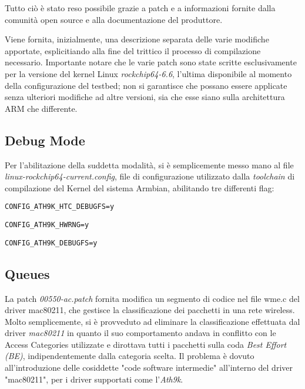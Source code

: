 Tutto ciò è stato reso possibile grazie a patch e a informazioni fornite dalla comunità open source e alla documentazione del produttore.

Viene fornita, inizialmente, una descrizione separata delle varie modifiche apportate, esplicitiando alla fine del trittico il processo di compilazione necessario. Importante notare che le varie patch sono state scritte esclusivamente per la versione del kernel Linux \textit{rockchip64-6.6}, l'ultima disponibile al momento della configurazione del testbed; non si garantisce che possano essere applicate senza ulteriori modifiche ad altre versioni, sia che esse siano sulla architettura ARM che differente.

\subsection[Debug Mode]{Debug Mode}
Per l'abilitazione della suddetta modalità, si è semplicemente messo mano al file \textit{linux-rockchip64-current.config}, file di configurazione utilizzato dalla \textit{toolchain} di compilazione del Kernel del sistema Armbian, abilitando tre differenti flag\cite{linux_wireless}:

\verb|CONFIG_ATH9K_HTC_DEBUGFS=y|

\verb|CONFIG_ATH9K_HWRNG=y|

\verb|CONFIG_ATH9K_DEBUGFS=y|

\subsection[Queues]{Queues}
La patch \textit{00550-ac.patch} fornita modifica un segmento di codice nel file wme.c del driver mac80211, che gestisce la classificazione dei pacchetti in una rete wireless.
Molto semplicemente, si è provveduto ad eliminare la classificazione effettuata dal driver \textit{mac80211} in quanto il suo comportamento andava in conflitto con le Access Categories utilizzate e dirottava tutti i pacchetti sulla coda \textit{Best Effort (BE)}, indipendentemente dalla categoria scelta.
Il problema è dovuto all'introduzione delle cosiddette "code software intermedie" all'interno del driver "mac80211", per i driver supportati\cite{intermediate_queue} come l'\textit{Ath9k}.

